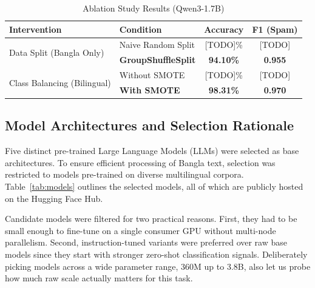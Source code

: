 \documentclass[journal]{IEEEtran}
\begin{document}
\begin{table}[htbp]
\caption{Ablation Study Results (Qwen3-1.7B)}
\label{tab:ablation}
\centering
\begin{tabular}{llcc}
\toprule
\textbf{Intervention} & \textbf{Condition} & \textbf{Accuracy} & \textbf{F1 (Spam)} \\
\midrule
\multirow{2}{*}{Data Split (Bangla Only)} & Naive Random Split & [TODO]\% & [TODO] \\
 & \textbf{GroupShuffleSplit} & \textbf{94.10\%} & \textbf{0.955} \\
\midrule
\multirow{2}{*}{Class Balancing (Bilingual)} & Without SMOTE & [TODO]\% & [TODO] \\
 & \textbf{With SMOTE} & \textbf{98.31\%} & \textbf{0.970} \\
\bottomrule
\end{tabular}
\end{table}

\subsection{Model Architectures and Selection Rationale}

Five distinct pre-trained Large Language Models (LLMs) were selected as base architectures. To ensure efficient processing of Bangla text, selection was restricted to models pre-trained on diverse multilingual corpora. Table~\ref{tab:models} outlines the selected models, all of which are publicly hosted on the Hugging Face Hub.

\begin{table}[htbp]
\caption{Selected Pretrained LLMs}
\label{tab:models}
\centering
{}
\end{table}

Candidate models were filtered for two practical reasons. First, they had to be small enough to fine-tune on a single consumer GPU without multi-node parallelism. Second, instruction-tuned variants were preferred over raw base models since they start with stronger zero-shot classification signals. Deliberately picking models across a wide parameter range, 360M up to 3.8B, also let us probe how much raw scale actually matters for this task.
\end{document}
